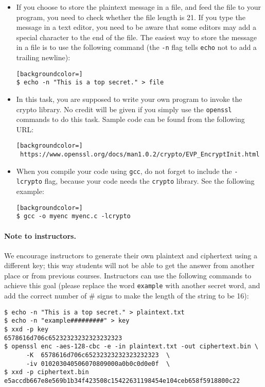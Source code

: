 \begin{itemize}
\item If you choose to store the plaintext message in
a file, and feed the file to your program, you need to check
whether the file length is 21. If you type the message in a text editor,
you need to be aware that some editors may add a special
character to the end of the file. The easiest way to store the message
in a file is to use the following
command (the \texttt{-n} flag
tells \texttt{echo} not to  add a trailing newline):


\begin{lstlisting}[backgroundcolor=]
$ echo -n "This is a top secret." > file
\end{lstlisting}

\item In this task, you are supposed to write your own program
to invoke the crypto library. No credit will be given
if you simply use the {\tt openssl} commands to do this task.
Sample code can be found from the following URL:
\begin{lstlisting}[backgroundcolor=]
 https://www.openssl.org/docs/man1.0.2/crypto/EVP_EncryptInit.html
\end{lstlisting}


\item When you compile your code using  \texttt{gcc},
do not forget to include the \texttt{-lcrypto} flag, because your code
needs the \texttt{crypto} library. See the following example:

\begin{lstlisting}[backgroundcolor=]
$ gcc -o myenc myenc.c -lcrypto
\end{lstlisting}

\end{itemize}

\paragraph{Note to instructors.}
We encourage instructors to generate their own plaintext and ciphertext using
a different key; this way students will not be able to get the answer from
another place or from previous courses. Instructors can use the
following commands to achieve this goal (please replace the word \texttt{example}
with another secret word, and add the correct number of \# signs to make
the length of the string to be 16):

\begin{lstlisting}
$ echo -n "This is a top secret." > plaintext.txt
$ echo -n "example#########" > key
$ xxd -p key
6578616d706c65232323232323232323
$ openssl enc -aes-128-cbc -e -in plaintext.txt -out ciphertext.bin \
      -K  6578616d706c65232323232323232323  \
      -iv 010203040506070809000a0b0c0d0e0f  \
$ xxd -p ciphertext.bin
e5accdb667e8e569b1b34f423508c15422631198454e104ceb658f5918800c22
\end{lstlisting}



